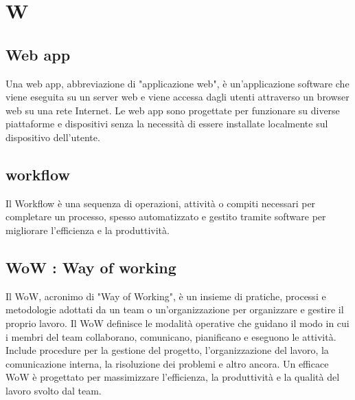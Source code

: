 \section{W}



\vspace{2em}
\subsection*{Web app}
Una web app, abbreviazione di "applicazione web", è un'applicazione software che viene eseguita su un server web e viene accessa dagli utenti attraverso un browser web su una rete Internet. Le web app sono progettate per funzionare su diverse piattaforme e dispositivi senza la necessità di essere installate localmente sul dispositivo dell'utente.

\vspace{2em}
\subsection*{workflow}
Il Workflow è una sequenza di operazioni, attività o compiti necessari per completare un processo, spesso automatizzato e gestito tramite software per migliorare l'efficienza e la produttività.


\vspace{2em}
\subsection*{WoW : Way of working}
Il WoW, acronimo di "Way of Working", è un insieme di pratiche, processi e metodologie adottati da un team o un'organizzazione per organizzare e gestire il proprio lavoro. Il WoW definisce le modalità operative che guidano il modo in cui i membri del team collaborano, comunicano, pianificano e eseguono le attività. Include procedure per la gestione del progetto, l'organizzazione del lavoro, la comunicazione interna, la risoluzione dei problemi e altro ancora. Un efficace WoW è progettato per massimizzare l'efficienza, la produttività e la qualità del lavoro svolto dal team.